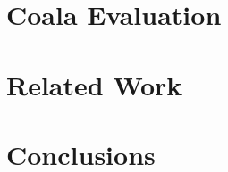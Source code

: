 \documentclass[pageno]{jpaper}
\newcommand{\sys}{Coala\xspace}
\begin{document}


\section{\sys Evaluation}
\label{sec:evaluation}



\section{Related Work}
\label{sec:related_work}



\section{Conclusions}
\label{sec:conclusions}





\end{document}
